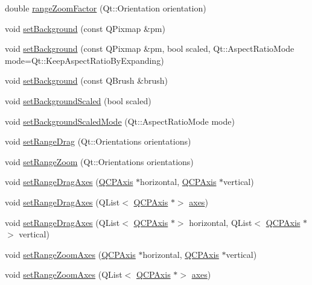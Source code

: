 \begin{DoxyCompactItemize}
\item 
double \hyperlink{classQCPAxisRect_ae4e6c4d143aacc88d2d3c56f117c2fe1}{range\+Zoom\+Factor} (Qt\+::\+Orientation orientation)
\item 
void \hyperlink{classQCPAxisRect_af615ab5e52b8e0a9a0eff415b6559db5}{set\+Background} (const Q\+Pixmap \&pm)
\item 
void \hyperlink{classQCPAxisRect_ac48a2d5d9b7732e73b86605c69c5e4c1}{set\+Background} (const Q\+Pixmap \&pm, bool scaled, Qt\+::\+Aspect\+Ratio\+Mode mode=Qt\+::\+Keep\+Aspect\+Ratio\+By\+Expanding)
\item 
void \hyperlink{classQCPAxisRect_a22a22b8668735438dc06f9a55fe46b33}{set\+Background} (const Q\+Brush \&brush)
\item 
void \hyperlink{classQCPAxisRect_ae6d36c3e0e968ffb991170a018e7b503}{set\+Background\+Scaled} (bool scaled)
\item 
void \hyperlink{classQCPAxisRect_a5ef77ea829c9de7ba248e473f48f7305}{set\+Background\+Scaled\+Mode} (Qt\+::\+Aspect\+Ratio\+Mode mode)
\item 
void \hyperlink{classQCPAxisRect_ae6aef2f7211ba6097c925dcd26008418}{set\+Range\+Drag} (Qt\+::\+Orientations orientations)
\item 
void \hyperlink{classQCPAxisRect_a7960a9d222f1c31d558b064b60f86a31}{set\+Range\+Zoom} (Qt\+::\+Orientations orientations)
\item 
void \hyperlink{classQCPAxisRect_a648cce336bd99daac4a5ca3e5743775d}{set\+Range\+Drag\+Axes} (\hyperlink{classQCPAxis}{Q\+C\+P\+Axis} $\ast$horizontal, \hyperlink{classQCPAxis}{Q\+C\+P\+Axis} $\ast$vertical)
\item 
void \hyperlink{classQCPAxisRect_ab756bc5f129115fa3e8783617292fc1a}{set\+Range\+Drag\+Axes} (Q\+List$<$ \hyperlink{classQCPAxis}{Q\+C\+P\+Axis} $\ast$$>$ \hyperlink{classQCPAxisRect_a8db4722cb93e9c4a6f0d91150c200867}{axes})
\item 
void \hyperlink{classQCPAxisRect_ab767e659f952fd7cbf61faaf33feefc5}{set\+Range\+Drag\+Axes} (Q\+List$<$ \hyperlink{classQCPAxis}{Q\+C\+P\+Axis} $\ast$$>$ horizontal, Q\+List$<$ \hyperlink{classQCPAxis}{Q\+C\+P\+Axis} $\ast$$>$ vertical)
\item 
void \hyperlink{classQCPAxisRect_a9442cca2aa358405f39a64d51eca13d2}{set\+Range\+Zoom\+Axes} (\hyperlink{classQCPAxis}{Q\+C\+P\+Axis} $\ast$horizontal, \hyperlink{classQCPAxis}{Q\+C\+P\+Axis} $\ast$vertical)
\item 
void \hyperlink{classQCPAxisRect_a07a41be4eda0d42abe49475e9fa38b92}{set\+Range\+Zoom\+Axes} (Q\+List$<$ \hyperlink{classQCPAxis}{Q\+C\+P\+Axis} $\ast$$>$ \hyperlink{classQCPAxisRect_a8db4722cb93e9c4a6f0d91150c200867}{axes})

\end{DoxyCompactItemize}
